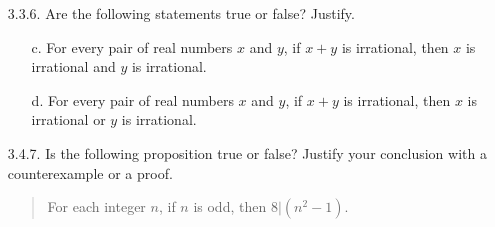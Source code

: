 \documentclass[12pt]{article}
\newcommand{\Z}{\mathbb{Z}}
\begin{document}
\begin{enumerate}

\hrulefill


\item[3.3.6.]  Are the following statements true or false?  Justify.
\begin{enumerate}
\item[c.] For every pair of real numbers $x$ and $y$, if $x+y$ is irrational, then $x$ is irrational and $y$ is irrational.
\item[d.] For every pair of real numbers $x$ and $y$, if $x+y$ is irrational, then $x$ is irrational or $y$ is irrational.
\end{enumerate}

\hrulefill

\item[3.4.7.] Is the following proposition true or false?  Justify your conclusion with a counterexample or a proof.
\begin{quote} For each integer $n$, if $n$ is odd, then $8|(n^2-1)$.
\end{quote}


\end{enumerate}
\end{document}
